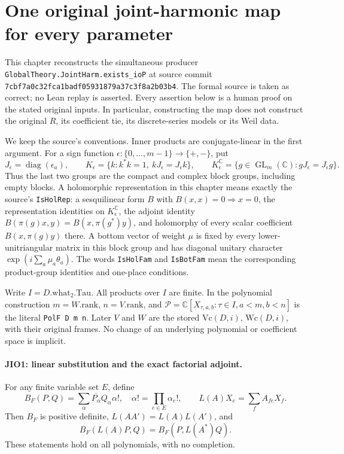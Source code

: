 \section{One original joint-harmonic map for every parameter}
\label{sec:joint-harmonic-io}

This chapter reconstructs the simultaneous producer
\texttt{GlobalTheory.JointHarm.exists\_ioP} at source commit
\texttt{7cbf7a0c32fca1badf05931879a37c3f8a2b03b4}.
The formal source is taken as correct; no Lean replay is asserted.
Every assertion below is a human proof on the stated original inputs.
In particular, constructing the map does not construct the original
\(R\), its coefficient tie, its discrete-series models or its Weil data.

We keep the source's conventions.  Inner products are conjugate-linear
in the first argument.  For a sign function
\(\epsilon:\{0,\ldots,m-1\}\to\{+,-\}\), put
\[
 J_\epsilon=\operatorname{diag}(\epsilon_a),\qquad
 K_\epsilon=\{k:k^*k=1,\ kJ_\epsilon=J_\epsilon k\},\qquad
 K_\epsilon^{\mathbb C}=\{g\in\operatorname{GL}_m(\mathbb C):
                         gJ_\epsilon=J_\epsilon g\}.
 \tag{JIO.1}
\]
Thus the last two groups are the compact and complex block groups,
including empty blocks.  A holomorphic representation in this chapter
means exactly the source's \texttt{IsHolRep}: a sesquilinear form \(B\)
with \(B(x,x)=0\Rightarrow x=0\), the representation identities on
\(K_\epsilon^{\mathbb C}\), the adjoint identity
\(B(\pi(g)x,y)=B(x,\pi(g^*)y)\), and holomorphy of every scalar
coefficient \(B(x,\pi(g)y)\) there.  A bottom vector of weight \(\mu\)
is fixed by every lower-unitriangular matrix in this block group and
has diagonal unitary character
\(\exp(i\sum_a\mu_a\theta_a)\).
The words \texttt{IsHolFam} and \texttt{IsBotFam} mean the corresponding
product-group identities and one-place conditions.

Write \(I=D.\mathrm{what}_2.\mathrm{Tau}\).  All products over \(I\)
are finite.  In the polynomial construction \(m=W.\mathrm{rank}\),
\(n=V.\mathrm{rank}\), and
\(\mathcal P=\mathbb C[X_{\tau,a,b}:\tau\in I,a<m,b<n]\)
is the literal \texttt{PolF D m n}.  Later \(V\) and \(W\) are the
stored \(\mathrm{Vc}(D,i)\), \(\mathrm{Wc}(D,i)\), with their original
frames.  No change of an underlying polynomial or coefficient space
is implicit.

\paragraph{JIO1: linear substitution and the exact factorial adjoint.}
\label{claim:JIO1}
For any finite variable set \(E\), define
\[
 B_F(P,Q)=\sum_{\alpha}\overline{P_\alpha}Q_\alpha\alpha!,
 \quad \alpha!=\prod_{e\in E}\alpha_e!,
 \qquad L(A)X_e=\sum_f A_{fe}X_f .
 \tag{JIO.2}
\]
Then \(B_F\) is positive definite,
\(L(AA')=L(A)L(A')\), and
\[
                  B_F(L(A)P,Q)=B_F(P,L(A^*)Q).
 \tag{JIO.3}
\]
These statements hold on all polynomials, with no completion.

